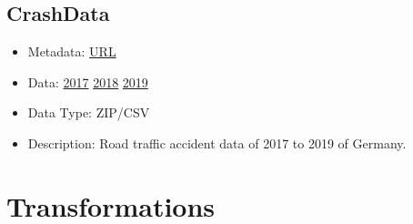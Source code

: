 \documentclass[
  letterpaper,
  DIV=11,
  numbers=noendperiod]{scrartcl}
\providecommand{\tightlist}{%
  \setlength{\itemsep}{0pt}\setlength{\parskip}{0pt}}\usepackage{longtable,booktabs,array}
\begin{document}
\hypertarget{crashdata}{%
\subsection{CrashData}\label{crashdata}}

\begin{itemize}
\tightlist
\item
  Metadata:
  \href{https://unfallatlas.statistikportal.de/_opendata2022.html}{URL}
\item
  Data:
  \href{https://www.opengeodata.nrw.de/produkte/transport_verkehr/unfallatlas/Unfallorte2017_EPSG25832_CSV.zip}{2017}
  \href{https://www.opengeodata.nrw.de/produkte/transport_verkehr/unfallatlas/Unfallorte2018_EPSG25832_CSV.zip}{2018}
  \href{https://www.opengeodata.nrw.de/produkte/transport_verkehr/unfallatlas/Unfallorte2019_EPSG25832_CSV.zip}{2019}
\item
  Data Type: ZIP/CSV
\item
  Description: Road traffic accident data of 2017 to 2019 of Germany.
\end{itemize}

\hypertarget{transformations}{%
\section{Transformations}\label{transformations}}
\end{document}
